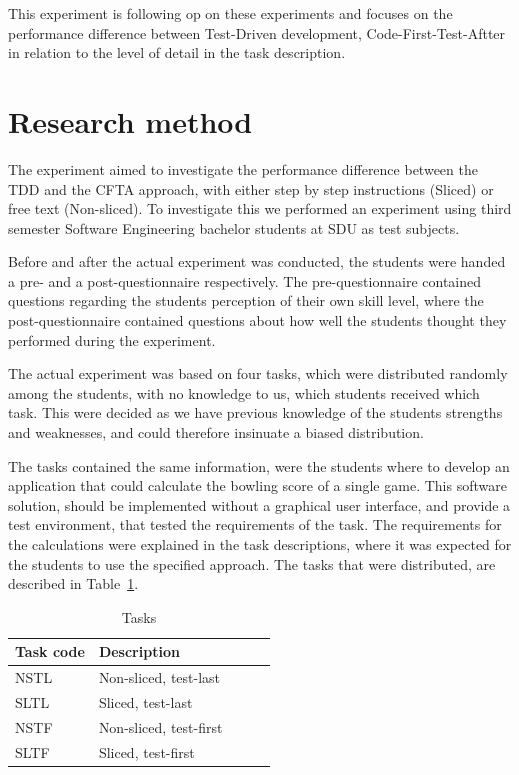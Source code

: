 \documentclass{sig-alternate-05-2015}
\begin{document}
This  experiment is following op on these experiments and focuses on the performance difference between Test-Driven development, Code-First-Test-Aftter in relation to the level of detail in the task description.

\section{Research method}

\label{sec:Research method}
The experiment aimed to investigate the performance difference between the TDD and the CFTA approach, with either step by step instructions (Sliced) or free text (Non-sliced). To investigate this we performed an experiment using third semester Software Engineering bachelor students at SDU as test subjects.

Before and after the actual experiment was conducted, the students were handed a pre- and a post-questionnaire respectively.
The pre-questionnaire contained questions regarding the students perception of their own skill level, where the post-questionnaire contained questions about how well the students thought they performed during the experiment.

The actual experiment was based on four tasks, which were distributed randomly among the students, with no know\-ledge to us, which students received which task. This were decided as we have previous knowledge of the students strengths and weaknesses, and could therefore insinuate a biased distribution.

The tasks contained the same information, were the students where to develop an application that could calculate the bow\-ling score of a single game. This software solution, should be implemented without a graphical user interface, and provide a test environment, that tested the requirements of the task. The requirements for the calculations were explained in the task descriptions, where it was expected for the students to use the specified approach.
The tasks that were distributed, are described in Table~\ref{TaskTable}.

\begin{table}[!ht]
\centering
\caption{Tasks}
\label{TaskTable}
\begin{tabular}{|l|p{0.68\linewidth}|}
\hline
\textbf{Task code} & \textbf{Description} \\
\hline
\hline
NSTL & Non-sliced, test-last \\
SLTL & Sliced, test-last \\
NSTF & Non-sliced, test-first \\
SLTF & Sliced, test-first\\
\hline
\end{tabular}
\end{table}
\end{document}
